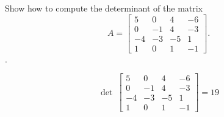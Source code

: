 
\begin{exerciseStatement}


Show how to compute the determinant of the matrix \[A= \left[\begin{array}{cccc}
5 & 0 & 4 & -6 \\
0 & -1 & 4 & -3 \\
-4 & -3 & -5 & 1 \\
1 & 0 & 1 & -1
\end{array}\right] .\].


\end{exerciseStatement}
    
\begin{exerciseAnswer} 
\[\operatorname{det}\  \left[\begin{array}{cccc}
5 & 0 & 4 & -6 \\
0 & -1 & 4 & -3 \\
-4 & -3 & -5 & 1 \\
1 & 0 & 1 & -1
\end{array}\right] = 19 \]
\end{exerciseAnswer}
    
